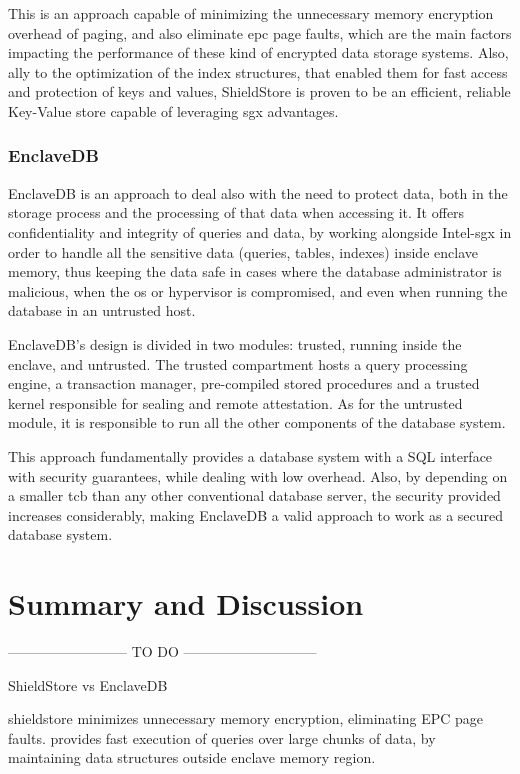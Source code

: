 This is an approach capable of minimizing the unnecessary memory encryption overhead of paging, and also eliminate \gls{epc} page faults, which are the main factors impacting the performance of these kind of encrypted data storage systems. Also, ally to the optimization of the index structures, that enabled them for fast access and protection of keys and values, ShieldStore is proven to be an efficient, reliable Key-Value store capable of leveraging \gls{sgx} advantages.


\subsubsection{EnclaveDB}
EnclaveDB \cite{enclavedbPaper} is an approach to deal also with the need to protect data, both in the storage process and the processing of that data when accessing it. It offers confidentiality and integrity of queries and data, by working alongside Intel-\gls{sgx} in order to handle all the sensitive data (queries, tables, indexes) inside enclave memory, thus keeping the data safe in cases where the database administrator is malicious, when the \gls{os} or hypervisor is compromised, and even when running the database in an untrusted host. 

EnclaveDB's design is divided in two modules: trusted, running inside the enclave, and untrusted. The trusted compartment hosts a query processing engine, a transaction manager, pre-compiled stored procedures and a trusted kernel responsible for sealing and remote attestation. As for the untrusted module, it is responsible to run all the other components of the database system. 

This approach fundamentally provides a database system with a SQL interface with security guarantees, while dealing with low overhead. Also, by depending on a smaller \gls{tcb} than any other conventional database server, the security provided increases considerably, making EnclaveDB a valid approach to work as a secured database system.




\section{Summary and Discussion}
-------------------------- TO DO -----------------------------

ShieldStore vs EnclaveDB

shieldstore minimizes unnecessary memory encryption, eliminating EPC page faults. provides fast execution of queries over large chunks of data, by maintaining data structures outside enclave memory region.

